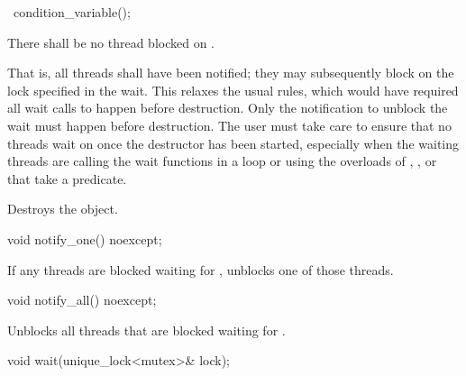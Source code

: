 %
\begin{itemdecl}
~condition_variable();
\end{itemdecl}

\begin{itemdescr}
\pnum
\precondition There shall be no thread blocked on . \begin{note} That is, all
threads shall have been notified; they may subsequently block on the lock specified in the
wait.
This relaxes the usual rules, which would have required all wait calls to happen before
destruction. Only the notification to unblock the wait must happen before destruction.
The user must take care to ensure that no threads wait on  once the destructor has
been started, especially when the waiting threads are calling the wait functions in a loop or
using the overloads of , , or  that take a predicate.
\end{note}

\pnum\effects Destroys the object.
\end{itemdescr}

%
%
\begin{itemdecl}
void notify_one() noexcept;
\end{itemdecl}

\begin{itemdescr}
\pnum\effects If any threads are blocked waiting for , unblocks one of those threads.
\end{itemdescr}

%
%
\begin{itemdecl}
void notify_all() noexcept;
\end{itemdecl}

\begin{itemdescr}
\pnum\effects Unblocks all threads that are blocked waiting for .
\end{itemdescr}

%
%
\begin{itemdecl}
void wait(unique_lock<mutex>& lock);
\end{itemdecl}

